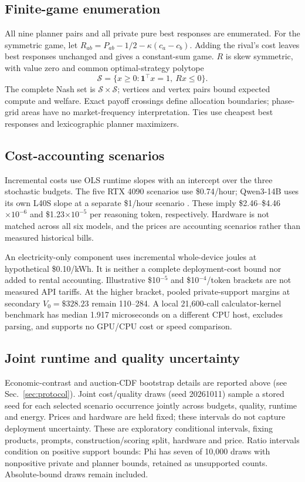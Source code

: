 \documentclass[sigconf,anonymous,nonacm]{acmart}
\begin{document}
\subsection{Finite-game enumeration}
All nine planner pairs and all private pure best responses are enumerated. For the symmetric game, let $R_{ab}=P_{ab}-1/2-\kappa(c_a-c_b)$. Adding the rival's cost leaves best responses unchanged and gives a constant-sum game. $R$ is skew symmetric, with value zero and common optimal-strategy polytope
\begin{equation}
\mathcal S=\{x\geq0:\mathbf1^\top x=1,\ Rx\leq0\}.
\label{eq:equilibriumpolytope}\end{equation}
The complete Nash set is $\mathcal S\times\mathcal S$; vertices and vertex pairs bound expected compute and welfare. Exact payoff crossings define allocation boundaries; phase-grid areas have no market-frequency interpretation. Ties use cheapest best responses and lexicographic planner maximizers.
\subsection{Cost-accounting scenarios}
Incremental costs use OLS runtime slopes with an intercept over the three stochastic budgets. The five RTX 4090 scenarios use \$0.74/hour; Qwen3-14B uses its own L40S slope at a separate \$1/hour scenario \citep{runpod2026pricing}. These imply \$2.46--\$4.46$\times10^{-6}$ and \$1.23$\times10^{-5}$ per reasoning token, respectively. Hardware is not matched across all six models, and the prices are accounting scenarios rather than measured historical bills.

An electricity-only component uses incremental whole-device joules at hypothetical \$0.10/kWh. It is neither a complete deployment-cost bound nor added to rental accounting. Illustrative \$10$^{-5}$ and \$10$^{-4}$/token brackets are not measured API tariffs. At the higher bracket, pooled private-support margins at secondary $V_0=\$328.23$ remain 110--284. A local 21,600-call calculator-kernel benchmark has median 1.917 microseconds on a different CPU host, excludes parsing, and supports no GPU/CPU cost or speed comparison.
\subsection{Joint runtime and quality uncertainty}
Economic-contrast and auction-CDF bootstrap details are reported above (see Sec.~\ref{sec:protocol}). Joint cost/quality draws (seed 20261011) sample a stored seed for each selected scenario occurrence jointly across budgets, quality, runtime and energy. Prices and hardware are held fixed; these intervals do not capture deployment uncertainty. These are exploratory conditional intervals, fixing products, prompts, construction/scoring split, hardware and price. Ratio intervals condition on positive support bounds: Phi has seven of 10,000 draws with nonpositive private and planner bounds, retained as unsupported counts. Absolute-bound draws remain included.
\end{document}
